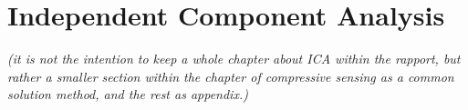 \chapter{Independent Component Analysis}\label{sec:ICA}
\textit{(it is not the intention to keep a whole chapter about ICA within the rapport, but rather a smaller section within the chapter of compressive sensing as a common solution method, and the rest as appendix.)}\\ \\ 

